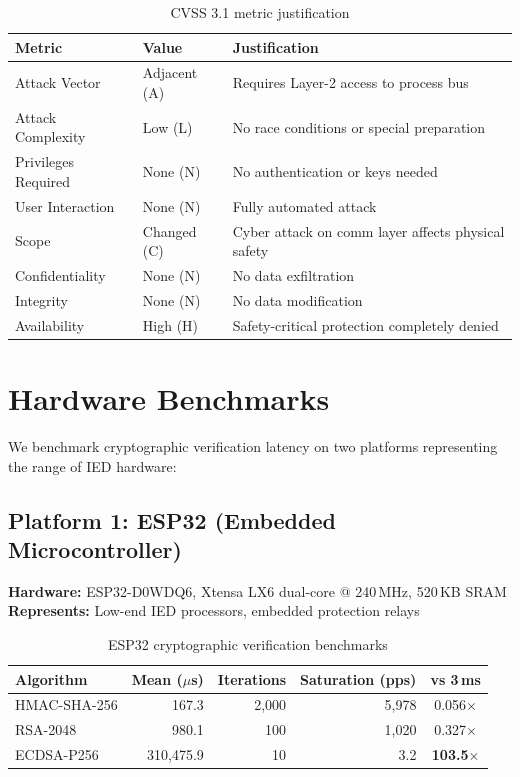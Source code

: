 \documentclass[11pt,a4paper]{article}
\begin{document}
\begin{table}[H]
\centering
\caption{CVSS 3.1 metric justification}
\begin{tabularx}{\textwidth}{@{}llX@{}}
\toprule
\textbf{Metric} & \textbf{Value} & \textbf{Justification} \\
\midrule
Attack Vector & Adjacent (A) & Requires Layer-2 access to process bus \\
Attack Complexity & Low (L) & No race conditions or special preparation \\
Privileges Required & None (N) & No authentication or keys needed \\
User Interaction & None (N) & Fully automated attack \\
Scope & Changed (C) & Cyber attack on comm layer affects physical safety \\
Confidentiality & None (N) & No data exfiltration \\
Integrity & None (N) & No data modification \\
Availability & High (H) & Safety-critical protection completely denied \\
\bottomrule
\end{tabularx}
\end{table}

\section{Hardware Benchmarks}
\label{sec:benchmarks}

We benchmark cryptographic verification latency on two platforms representing the range of IED hardware:

\subsection{Platform 1: ESP32 (Embedded Microcontroller)}

\textbf{Hardware:} ESP32-D0WDQ6, Xtensa LX6 dual-core @ 240\,MHz, 520\,KB SRAM\\
\textbf{Represents:} Low-end IED processors, embedded protection relays

\begin{table}[H]
\centering
\caption{ESP32 cryptographic verification benchmarks}
\label{tab:esp32}
\begin{tabular}{@{}lrrrc@{}}
\toprule
\textbf{Algorithm} & \textbf{Mean ($\mu$s)} & \textbf{Iterations} & \textbf{Saturation (pps)} & \textbf{vs 3\,ms} \\
\midrule
HMAC-SHA-256 & 167.3 & 2{,}000 & 5{,}978 & \color{defendgreen}0.056$\times$ \\
RSA-2048 & 980.1 & 100 & 1{,}020 & \color{warncolor}0.327$\times$ \\
ECDSA-P256 & 310{,}475.9 & 10 & 3.2 & \color{attackred}\textbf{103.5$\times$} \\
\bottomrule
\end{tabular}
\end{table}
\end{document}
